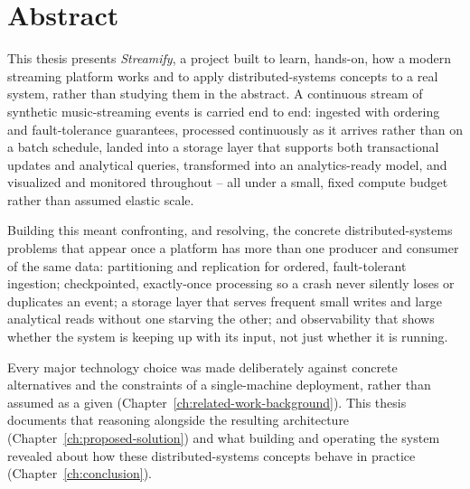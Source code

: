 \chapter*{Abstract}

This thesis presents \emph{Streamify}, a project built to learn, hands-on, how a modern streaming platform works and to apply distributed-systems concepts to a real system, rather than studying them in the abstract. A continuous stream of synthetic music-streaming events is carried end to end: ingested with ordering and fault-tolerance guarantees, processed continuously as it arrives rather than on a batch schedule, landed into a storage layer that supports both transactional updates and analytical queries, transformed into an analytics-ready model, and visualized and monitored throughout -- all under a small, fixed compute budget rather than assumed elastic scale.

\noindent Building this meant confronting, and resolving, the concrete distributed-systems problems that appear once a platform has more than one producer and consumer of the same data: partitioning and replication for ordered, fault-tolerant ingestion; checkpointed, exactly-once processing so a crash never silently loses or duplicates an event; a storage layer that serves frequent small writes and large analytical reads without one starving the other; and observability that shows whether the system is keeping up with its input, not just whether it is running.

\noindent Every major technology choice was made deliberately against concrete alternatives and the constraints of a single-machine deployment, rather than assumed as a given (Chapter~\ref{ch:related-work-background}). This thesis documents that reasoning alongside the resulting architecture (Chapter~\ref{ch:proposed-solution}) and what building and operating the system revealed about how these distributed-systems concepts behave in practice (Chapter~\ref{ch:conclusion}).
